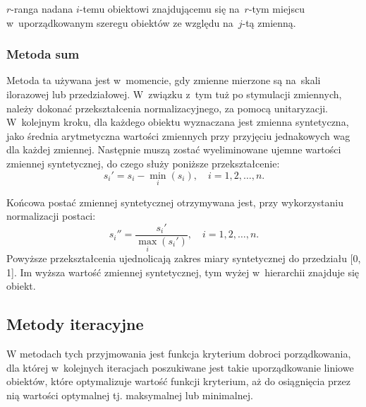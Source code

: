 \documentclass[12pt,a4paper]{report}
\begin{document}
$r$-ranga nadana $i$-temu obiektowi znajdującemu się na~$r$-tym miejscu w~uporządkowanym
szeregu obiektów ze względu na~$j$-tą zmienną.


\subsubsection{Metoda sum}


Metoda ta używana jest w~momencie, gdy zmienne mierzone są na~skali ilorazowej lub przedziałowej. W~związku z~tym tuż po stymulacji zmiennych, należy dokonać przekształcenia normalizacyjnego, za pomocą unitaryzacji. W~kolejnym kroku, dla każdego obiektu wyznaczana jest zmienna syntetyczna, jako średnia arytmetyczna wartości zmiennych przy przyjęciu jednakowych wag dla każdej zmiennej.
Następnie muszą zostać wyeliminowane ujemne wartości zmiennej syntetycznej, do czego służy poniższe przekształcenie:
$$
s_{i}'=s_{i}-\min\limits_{i}(s_i), \quad i=1, 2, \ldots, n.
$$

Końcowa postać zmiennej syntetycznej otrzymywana jest, przy wykorzystaniu normalizacji postaci: %
$$
s_{i}''=\frac{s_{i}'}{\max\limits_{i}(s_{i}')},\quad i=1, 2, \ldots, n.
$$
Powyższe przekształcenia ujednolicają zakres miary syntetycznej do przedziału [0, 1]. Im wyższa wartość zmiennej syntetycznej, tym wyżej w~hierarchii znajduje się obiekt.%


\subsection{Metody iteracyjne}

W metodach tych przyjmowania jest funkcja kryterium dobroci porządkowania, dla której w~kolejnych iteracjach poszukiwane jest takie uporządkowanie liniowe obiektów, które optymalizuje wartość funkcji kryterium, aż do osiągnięcia przez nią wartości optymalnej tj. maksymalnej lub minimalnej. 
\end{document}
